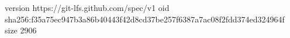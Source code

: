 version https://git-lfs.github.com/spec/v1
oid sha256:f35a75ec947b3a86b40443f42d8cd37be257f6387a7ac08f2fdd374ed324964f
size 2906
